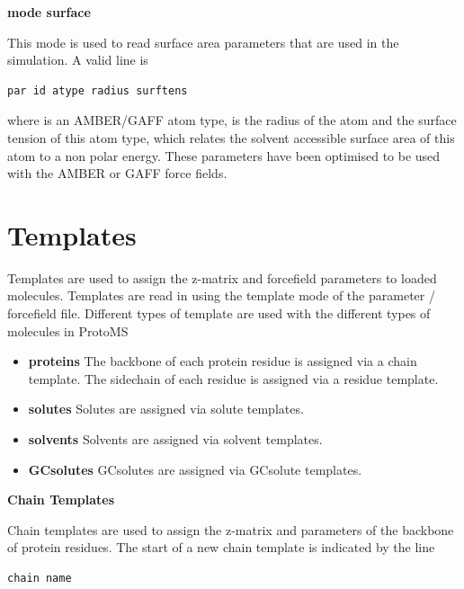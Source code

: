\documentclass[letterpaper,10pt,english]{sphinxmanual}
\begin{document}
\textbf{mode surface}

This mode is used to read surface area parameters that are used in the simulation. A valid line is

\begin{Verbatim}[frame=single,commandchars=\\\{\}]
par id atype radius surftens
\end{Verbatim}

where  is an AMBER/GAFF atom type,  is the radius of the atom and  the surface tension of this atom type, which relates the solvent accessible surface area of this atom to a non polar energy. These parameters have been optimised to be used with the AMBER or GAFF force fields.


\section{Templates}
\label{protoms:templates}\label{protoms:temref}
Templates are used to assign the z-matrix and forcefield parameters to loaded molecules. Templates are read in using the template mode of the parameter / forcefield file. Different types of template are used with the different types of molecules in ProtoMS
\begin{itemize}
\item {} 
\textbf{proteins} The backbone of each protein residue is assigned via a chain template. The sidechain of each residue is assigned via a residue template.

\item {} 
\textbf{solutes} Solutes are assigned via solute templates.

\item {} 
\textbf{solvents} Solvents are assigned via solvent templates.

\item {} 
\textbf{GCsolutes} GCsolutes are assigned via GCsolute templates.

\end{itemize}

\textbf{Chain Templates}

Chain templates are used to assign the z-matrix and parameters of the backbone of protein residues. The start of a new chain template is indicated by the line

\begin{Verbatim}[frame=single,commandchars=\\\{\}]
chain name
\end{Verbatim}
\end{document}
